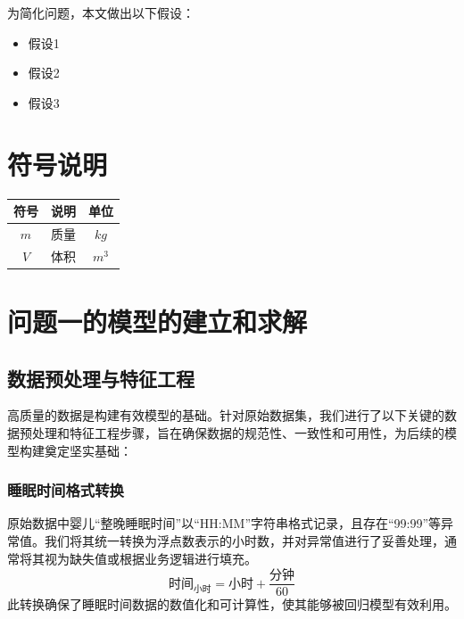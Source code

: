 \documentclass[withoutpreface,bwprint]{cumcmthesis}
\begin{document}
为简化问题，本文做出以下假设：

\begin{itemize}[itemindent=2em]
\item 假设1
\item 假设2
\item 假设3
\end{itemize}


\section{符号说明}
\begin{table}[H]
\centering
\begin{tabularx}{\textwidth}{CLC}
\toprule
符号    & 说明    & 单位 \\
\midrule
$m     $& 质量 & $kg$ \\
$V     $& 体积 & $m^3$ \\
\bottomrule
\end{tabularx}
\label{tab:符号说明}
\end{table}







\section{问题一的模型的建立和求解}


\subsection{数据预处理与特征工程}
高质量的数据是构建有效模型的基础。针对原始数据集，我们进行了以下关键的数据预处理和特征工程步骤，旨在确保数据的规范性、一致性和可用性，为后续的模型构建奠定坚实基础：

\subsubsection{睡眠时间格式转换}
原始数据中婴儿“整晚睡眠时间”以“HH:MM”字符串格式记录，且存在“99:99”等异常值。我们将其统一转换为浮点数表示的小时数，并对异常值进行了妥善处理，通常将其视为缺失值或根据业务逻辑进行填充。
$$ \text{时间}_{\text{小时}} = \text{小时} + \frac{\text{分钟}}{60} $$
此转换确保了睡眠时间数据的数值化和可计算性，使其能够被回归模型有效利用。
\end{document}
